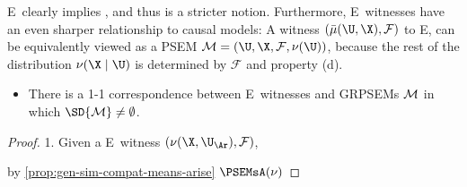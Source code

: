 \begin{subappendices}
{%
E\scibility\ 
clearly implies \scibility, 
and thus is a stricter notion. 
Furthermore, E\scibility\ witnesses have an even sharper relationship to causal models:
A witness $(\bar\mu(\U, \X), \mathcal F)$ to E\scibility, 
can be equivalently viewed as a PSEM $\mathcal M = (\U,\X, \mathcal F, \nu(\U))$, 
because the rest of the distribution $\nu(\X \mid \U)$ is determined by $\mathcal F$ and property (d). 

\begin{prop}
    \begin{itemize}
        \item There is a 1-1 correspondence between E\scibility\ witnesses and GRPSEMs $\cal M$ in which $\SD{\cal M} \ne \emptyset$. 
    \end{itemize}
\end{prop}
\begin{proof}
    1. Given a E\scibility\ witness $(\nu(\X, \U_\Ar), \mathcal F)$, 
    
    by \cref{prop:gen-sim-compat-means-arise}
    $\PSEMsA(\nu)$
\end{proof}

%
}
\end{subappendices}
